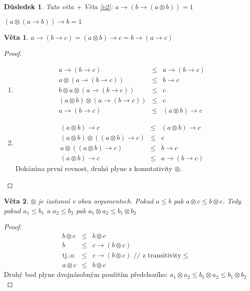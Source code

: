 \documentclass[10pt, a4paper, titlepage]{article}
\theoremstyle{note}
\newtheorem{veta}{Věta}
\newtheorem{dusledek}{Důsledek}
\begin{document}
\begin{dusledek}
Tato věta + Věta \ref{v2}: $a\rightarrow (b\rightarrow (a\otimes b)) = 1$

\hspace{5cm} $(a\otimes (a\rightarrow b))\rightarrow b=1$
\end{dusledek}
\begin{veta}
$a\rightarrow (b\rightarrow c) = (a\otimes b)\rightarrow c = b\rightarrow(a\rightarrow c)$
\end{veta}
\begin{proof}
\begin{enumerate}
\item \begin{eqnarray}
  a\rightarrow(b\rightarrow c)&\leq& a\rightarrow(b\rightarrow c) \nonumber\\
  a\otimes(a\rightarrow(b\rightarrow c))&\leq& b\rightarrow c \nonumber\\
  b\otimes a\otimes(a\rightarrow(b\rightarrow c))&\leq& c \nonumber\\
  (a\otimes b)\otimes(a\rightarrow(b\rightarrow c))&\leq& c \nonumber\\
  a\rightarrow(b\rightarrow c)&\leq& (a\otimes b)\rightarrow c\nonumber
  \end{eqnarray}

\item \begin{eqnarray}
  (a\otimes b) \rightarrow c &\leq &(a\otimes b) \rightarrow c \nonumber\\
  (a\otimes b)\otimes((a\otimes b) \rightarrow c) &\leq &  c \nonumber\\
a\otimes((a\otimes b) \rightarrow c) &\leq & b\rightarrow c \nonumber\\
(a\otimes b) \rightarrow c &\leq & a \rightarrow (b\rightarrow c) \nonumber
  \end{eqnarray}
  Dokázána první rovnost, druhá plyne z komutativity $\otimes$.
\end{enumerate}
\end{proof}
\begin{veta}\label{v6}
$\otimes$ je izotonní v obou argumentech. Pokud $a\leq b$ pak $a\otimes c\leq b\otimes c$. Tedy pokud $a_{1}\leq b_{1}$ a $a_{2}\leq b_{2}$ pak $a_{1}\otimes a_{2}\leq b_{1}\otimes b_{2}$
\end{veta}
\begin{proof}
\begin{eqnarray}
  b\otimes c &\leq&b\otimes c \nonumber\\
  b &\leq& c\rightarrow (b\otimes c) \nonumber\\
  \text{tj.:} a&\leq& c\rightarrow(b\otimes c) \text{  // z transitivity} \leq \nonumber\\
  a\otimes c &\leq&b\otimes c\nonumber
  \end{eqnarray}
Druhý bod plyne dvojnásobným použitím předchozího: $a_{1}\otimes a_{2}\leq b_{1}\otimes a_{2}\leq b_{1}\otimes b_{2}$
\end{proof}
\end{document}
